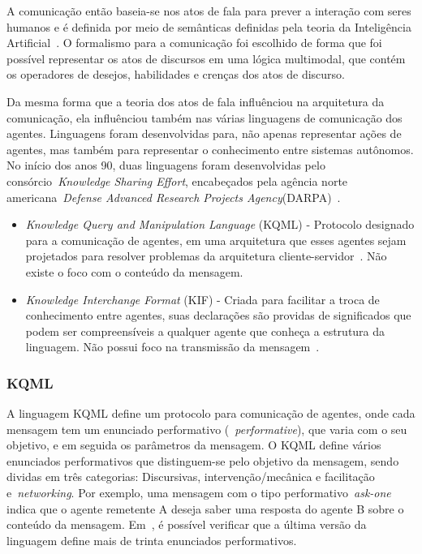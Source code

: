 A comunicação então baseia-se nos atos de fala para prever a interação com seres humanos e é definida por meio de semânticas definidas pela teoria da Inteligência Artificial~\cite{wooldridge04}. O formalismo para a comunicação foi escolhido de forma que foi possível representar os atos de discursos em uma lógica multimodal, que contém os operadores de desejos, habilidades e crenças dos atos de discurso.

Da mesma forma que a teoria dos atos de fala influênciou na arquitetura da comunicação, ela influênciou também nas várias linguagens de comunicação dos agentes. Linguagens foram desenvolvidas para, não apenas representar ações de agentes, mas também para representar o conhecimento entre sistemas autônomos. No início dos anos 90, duas linguagens foram desenvolvidas pelo consórcio~\emph{Knowledge Sharing Effort}, encabeçados pela agência norte americana~\emph{Defense Advanced Research Projects Agency}(DARPA)~\cite{kse}.
\begin{itemize}
	\item \emph{Knowledge Query and Manipulation Language} (KQML) - Protocolo designado para a comunicação de agentes, em uma arquitetura que esses agentes sejam projetados para resolver problemas da arquitetura cliente-servidor~\cite{preece1997}. Não existe o foco com o conteúdo da mensagem.
	\item \emph{Knowledge Interchange Format} (KIF) - Criada para facilitar a troca de conhecimento entre agentes, suas declarações são providas de significados que podem ser compreensíveis a qualquer agente que conheça a estrutura da linguagem. Não possui foco na transmissão da mensagem~\cite{kifmanual}.
\end{itemize}

\subsubsection{KQML}

A linguagem KQML define um protocolo para comunicação de agentes, onde cada mensagem tem um enunciado performativo (~\emph{performative}), que varia com o seu objetivo, e em seguida os parâmetros da mensagem. O KQML define vários enunciados performativos que distinguem-se pelo objetivo da mensagem, sendo dividas em três categorias: Discursivas, intervenção/mecânica e facilitação e~\emph{networking}. Por exemplo, uma mensagem com o tipo performativo~\emph{ask-one} indica que o agente remetente A deseja saber uma resposta do agente B sobre o conteúdo da mensagem. Em~\cite{preece1997}, é possível verificar que a última versão da linguagem define mais de trinta enunciados performativos.

